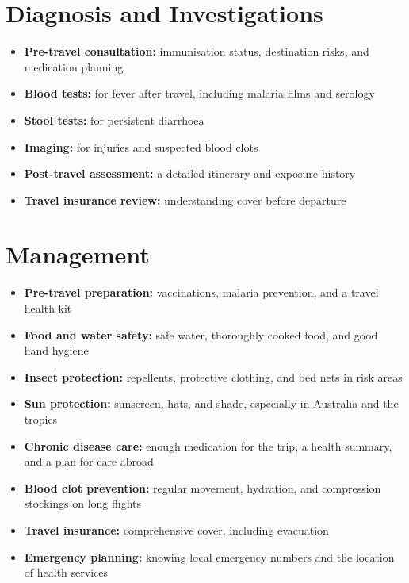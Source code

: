 \section*{Diagnosis and Investigations}
\begin{itemize}
    \item \textbf{Pre-travel consultation:} immunisation status, destination risks, and medication planning
    \item \textbf{Blood tests:} for fever after travel, including malaria films and serology
    \item \textbf{Stool tests:} for persistent diarrhoea
    \item \textbf{Imaging:} for injuries and suspected blood clots
    \item \textbf{Post-travel assessment:} a detailed itinerary and exposure history
    \item \textbf{Travel insurance review:} understanding cover before departure
\end{itemize}

\section*{Management}
\begin{itemize}
    \item \textbf{Pre-travel preparation:} vaccinations, malaria prevention, and a travel health kit
    \item \textbf{Food and water safety:} safe water, thoroughly cooked food, and good hand hygiene
    \item \textbf{Insect protection:} repellents, protective clothing, and bed nets in risk areas
    \item \textbf{Sun protection:} sunscreen, hats, and shade, especially in Australia and the tropics
    \item \textbf{Chronic disease care:} enough medication for the trip, a health summary, and a plan for care abroad
    \item \textbf{Blood clot prevention:} regular movement, hydration, and compression stockings on long flights
    \item \textbf{Travel insurance:} comprehensive cover, including evacuation
    \item \textbf{Emergency planning:} knowing local emergency numbers and the location of health services
\end{itemize}

